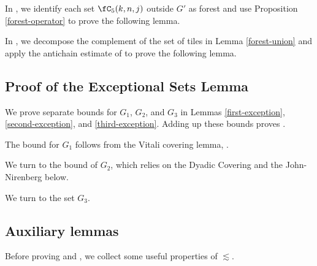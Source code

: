 In , we identify each set $\fC_5(k,n,j)$ outside $G'$ as forest and use Proposition
\ref{forest-operator} to prove the following lemma.


In , we decompose
the complement of the set of tiles in Lemma
\ref{forest-union} and apply the antichain estimate of
 to prove the following lemma.




\subsection{Proof of the Exceptional Sets Lemma}
\label{subsetexcset}


We prove separate bounds for $G_1$, $G_2$, and $G_3$
in Lemmas \ref{first-exception},
\ref{second-exception}, and \ref{third-exception}. Adding up these bounds proves .

The bound for $G_1$ follows from the Vitali covering lemma, .




We turn to the bound of $G_2$, which relies on the Dyadic Covering  and the
John-Nirenberg  below.














We turn to the set $G_3$.














\subsection{Auxiliary lemmas}
\label{subsec-lessim-aux}
Before proving  and , we collect some useful properties of $\lesssim$.

